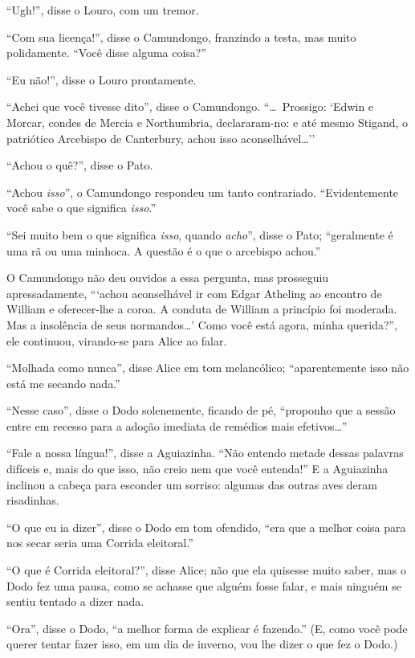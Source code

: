``Ugh!'', disse o Louro, com um tremor.

``Com sua licença!'', disse o Camundongo, franzindo a testa, mas muito
polidamente. ``Você disse alguma coisa?''

``Eu não!'', disse o Louro prontamente.

``Achei que você tivesse dito'', disse o Camundongo. ``\ldots{}~Prossigo: `Edwin e Morcar, condes de Mercia e Northumbria, declararam-no: e até
mesmo Stigand, o patriótico Arcebispo de Canterbury, achou isso
aconselhável\ldots{}''

``Achou o quê?'', disse o Pato.

``Achou \emph{isso}'', o Camundongo respondeu um tanto contrariado.
``Evidentemente você sabe o que significa \emph{isso}.''

``Sei muito bem o que significa \emph{isso}, quando \emph{acho}'', disse
o Pato; ``geralmente é uma rã ou uma minhoca. A questão é o que o
arcebispo achou.''

O Camundongo não deu ouvidos a essa pergunta, mas prosseguiu
apressadamente, ```achou aconselhável ir com Edgar Atheling ao encontro
de William e oferecer-lhe a coroa. A conduta de William a princípio foi
moderada. Mas a insolência de seus normandos\ldots{}' Como você está agora,
minha querida?'', ele continuou, virando-se para Alice ao falar.

``Molhada como nunca'', disse Alice em tom melancólico; ``aparentemente
isso não está me secando nada.''

``Nesse caso'', disse o Dodo solenemente, ficando de pé, ``proponho que
a sessão entre em recesso para a adoção imediata de remédios mais
efetivos\ldots{}''

``Fale a nossa língua!'', disse a Aguiazinha. ``Não entendo metade
dessas palavras difíceis e, mais do que isso, não creio nem que você
entenda!'' E a Aguiazinha inclinou a cabeça para esconder um sorriso:
algumas das outras aves deram risadinhas.

``O que eu ia dizer'', disse o Dodo em tom ofendido, ``era que a melhor
coisa para nos secar seria uma Corrida eleitoral.''

``O que é Corrida eleitoral?'', disse Alice; não que ela quisesse muito
saber, mas o Dodo fez uma pausa, como se achasse que alguém fosse falar,
e mais ninguém se sentiu tentado a dizer nada.

``Ora'', disse o Dodo, ``a melhor forma de explicar é fazendo.'' (E,
como você pode querer tentar fazer isso, em um dia de inverno, vou lhe
dizer o que fez o Dodo.)

